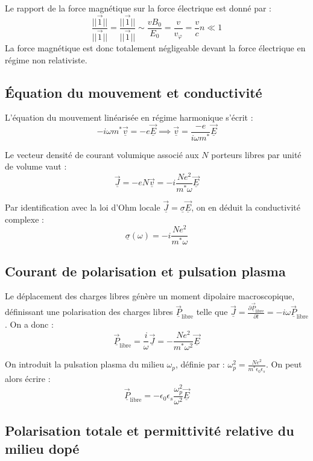 \documentclass[french]{yLectureNote}
\renewcommand{\vec}{\overrightarrow}
\newcommand{\norm}[1]{||\vec{1}||}
\begin{document}
Le rapport de la force magnétique sur la force électrique est donné par :
$$\frac{\norm{\vec{F}_m}}{\norm{\vec{F}_e}} = \frac{\norm{-e\vec{v}\wedge\vec{B}}}{\norm{-e\vec{E}}} \sim \frac{v B_0}{E_0} = \frac{v}{v_{\varphi}} = \frac{v}{c}n \ll 1$$
La force magnétique est donc totalement négligeable devant la force électrique en régime non relativiste.

\subsection{Équation du mouvement et conductivité}

L'équation du mouvement linéarisée en régime harmonique s'écrit :
$$-i\omega m^* \underline{\vec{v}} = -e \underline{\vec{E}} \implies \underline{\vec{v}} = \frac{-e}{i\omega m^*}\underline{\vec{E}}$$

Le vecteur densité de courant volumique associé aux $N$ porteurs libres par unité de volume vaut :
$$\underline{\vec{J}} = -e N \underline{\vec{v}} = -i \frac{N e^2}{m^* \omega}\underline{\vec{E}}$$

Par identification avec la loi d'Ohm locale $\underline{\vec{J}} = \underline{\sigma}\underline{\vec{E}}$, on en déduit la conductivité complexe :
$$\underline{\sigma}(\omega) = -i \frac{N e^2}{m^* \omega}$$

\subsection{Courant de polarisation et pulsation plasma}

Le déplacement des charges libres génère un moment dipolaire macroscopique, définissant une polarisation des charges libres $\underline{\vec{P}}_{\text{libre}}$ telle que $\underline{\vec{J}} = \frac{\partial \underline{\vec{P}}_{\text{libre}}}{\partial t} = -i\omega \underline{\vec{P}}_{\text{libre}}$. On a donc :
$$\underline{\vec{P}}_{\text{libre}} = \frac{i}{\omega}\underline{\vec{J}} = -\frac{N e^2}{m^* \omega^2}\underline{\vec{E}}$$

On introduit la pulsation plasma du milieu $\omega_p$, définie par : $\omega_p^2 = \frac{N e^2}{m^* \epsilon_0 \epsilon_s}$. On peut alors écrire :
$$\underline{\vec{P}}_{\text{libre}} = -\epsilon_0 \epsilon_s \frac{\omega_p^2}{\omega^2}\underline{\vec{E}}$$

\subsection{Polarisation totale et permittivité relative du milieu dopé}
\end{document}
